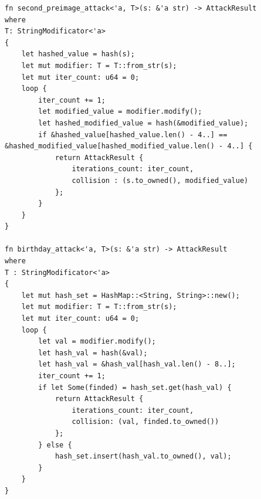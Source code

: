 \documentclass[12pt]{article}
\begin{document}
\begin{lstlisting}
fn second_preimage_attack<'a, T>(s: &'a str) -> AttackResult
where
T: StringModificator<'a>
{
    let hashed_value = hash(s);
    let mut modifier: T = T::from_str(s);
    let mut iter_count: u64 = 0;
    loop {
        iter_count += 1;
        let modified_value = modifier.modify();
        let hashed_modified_value = hash(&modified_value);
        if &hashed_value[hashed_value.len() - 4..] == &hashed_modified_value[hashed_modified_value.len() - 4..] {
            return AttackResult {
                iterations_count: iter_count,
                collision : (s.to_owned(), modified_value)
            };
        }
    }
}

fn birthday_attack<'a, T>(s: &'a str) -> AttackResult
where
T : StringModificator<'a>
{
    let mut hash_set = HashMap::<String, String>::new();
    let mut modifier: T = T::from_str(s);
    let mut iter_count: u64 = 0;
    loop {
        let val = modifier.modify();
        let hash_val = hash(&val);
        let hash_val = &hash_val[hash_val.len() - 8..];
        iter_count += 1;
        if let Some(finded) = hash_set.get(hash_val) {
            return AttackResult {
                iterations_count: iter_count,
                collision: (val, finded.to_owned())
            };
        } else {
            hash_set.insert(hash_val.to_owned(), val);
        }
    }
}
\end{lstlisting}
\end{document}
